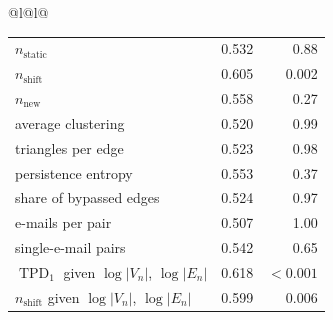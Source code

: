 \begin{table}[!ht]
\begin{tabular}[t]{@{}l@{\hspace{12pt}}l@{}}
\begin{tabular}[t]{@{}>{\raggedright\arraybackslash}p{}rr@{}}
$n_{\text{static}}$ & 0.532 & 0.88\\
$n_{\text{shift}}$ & 0.605 & 0.002\\
$n_{\text{new}}$ & 0.558 & 0.27\\
average clustering & 0.520 & 0.99\\
triangles per edge & 0.523 & 0.98\\
persistence entropy & 0.553 & 0.37\\
share of bypassed edges & 0.524 & 0.97\\
e-mails per pair & 0.507 & 1.00\\
single-e-mail pairs & 0.542 & 0.65\\
\midrule
$\operatorname{TPD}_1$ given $\log|V_n|$, $\log|E_n|$ & 0.618 & $<0.001$\\
$n_{\text{shift}}$ given $\log|V_n|$, $\log|E_n|$ & 0.599 & 0.006\\
\bottomrule
\end{tabular}
\end{tabular}
\end{table}
